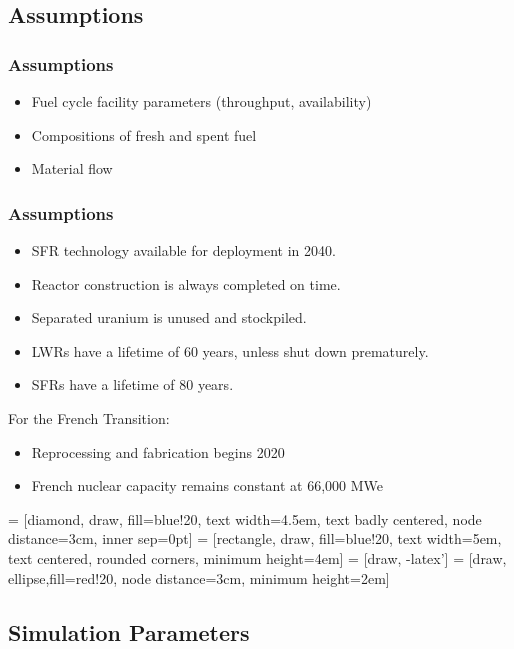 \subsection{Assumptions}

\begin{frame}
    \frametitle{Assumptions}
    \begin{itemize}
        \item Fuel cycle facility parameters (throughput, availability)
        \item Compositions of fresh and spent fuel
        \item Material flow
    \end{itemize}
\end{frame}

\begin{frame}
    \frametitle{Assumptions}
    \begin{itemize}
        \item SFR technology available for deployment in 2040.
        \item Reactor construction is always completed on time.
        \item Separated uranium is unused and stockpiled.
        \item LWRs have a lifetime of 60 years, unless shut down prematurely.
        \item SFRs have a lifetime of 80 years.
    \end{itemize}
    For the French Transition:
    \begin{itemize}
        \item Reprocessing and fabrication begins 2020
        \item French nuclear capacity remains constant at 66,000 MWe
    \end{itemize}
\end{frame}


 = [diamond, draw, fill=blue!20, 
text width=4.5em, text badly centered, node distance=3cm, inner sep=0pt]
 = [rectangle, draw, fill=blue!20, 
text width=5em, text centered, rounded corners, minimum height=4em]
 = [draw, -latex']
 = [draw, ellipse,fill=red!20, node distance=3cm,
minimum height=2em]

\subsection{Simulation Parameters}

